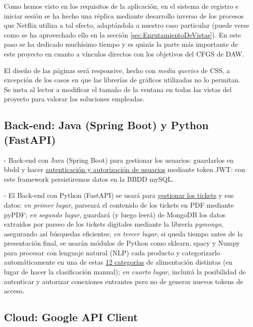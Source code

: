 \documentclass[a4paper,12pt]{report}
\begin{document}
			Como hemos visto en los requisitos de la aplicación, en el sistema de registro e iniciar sesión se ha hecho una réplica mediante desarrollo inverso de los procesos que Netflix utiliza a tal efecto, adaptándola a nuestro caso particular (puede verse como se ha aprovechado ello en la sección \ref{sec:EnrutamientoDeVistas}). En este paso se ha dedicado muchísimo tiempo y es quizás la parte más importante de este proyecto en cuanto a vínculos directos con los objetivos del CFGS de DAW.
			
			El diseño de las páginas será responsive, hecho con \textit{media queries} de CSS, a excepción de los casos en que las librerías de gráficos utilizadas no lo permitan. Se insta al lector a modificar el tamaño de la ventana en todas las vistas del proyecto para valorar las soluciones empleadas.
			
	
		 
		\subsection{Back-end: Java (Spring Boot) y Python (FastAPI)}
		
			- Back-end con Java (Spring Boot) para gestionar los usuarios: guardarlos en bbdd y hacer \underline{autenticación y autorización de usuarios} mediante token JWT: con este framework persistiremos datos en la BBDD mySQL.
			
			- El Back-end con Python (FastAPI) se usará para \underline{gestionar los tickets} y sus datos: \textit{en primer lugar}, parseará el contenido de los tickets en PDF mediante pyPDF; \textit{en segundo lugar}, guardará (y luego leerá) de MongoDB los datos extraídos por parseo de los tickets digitales mediante la librería \textit{pymongo}, asegurando así búsquedas eficientes; \textit{en tercer lugar}, si queda tiempo antes de la presentación final, se usarán módulos de Python como sklearn, spacy y Numpy para procesar con lenguaje natural (NLP) cada producto y categorizarlo automáticamente en una de estas \href{https://github.com/blackcub3s/mercApp/blob/main/APP%20WEB/__frontend__produccio__/app/js/dashboard/categories.js}{12 categorías} de alimentación distintas (en lugar de hacer la clasificación manual); \textit{en cuarto lugar}, incluirá la posibilidad de autenticar y autorizar conexiones entrantes pero no de generar nuevos tokens de acceso.
			
		
		\subsection{Cloud: Google API Client}
		
\end{document}
